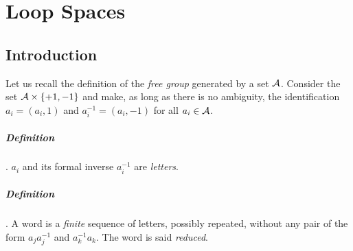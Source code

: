 \chapter{Loop Spaces}

\section{Introduction}

Let us recall the definition of the  {\em free group} generated by a set ${\cal A}$.
Consider the set ${\cal A}\times \lbrace +1, -1 \rbrace$ and
make, as long as there is no ambiguity, the identification $a_i= (a_i,1)$ and $a_i^{-1}= (a_i,-1)$
for all $a_i\in{\cal A}$.

\paragraph{Definition}.  $a_i$ and its formal inverse $a_i^{-1}$ are  {\em letters}.

\paragraph{Definition}. A word is a {\em finite} sequence of letters, possibly repeated,
without any pair of the form $a_ja_j^{-1}$ and $a_k^{-1}a_k$. The word is said {\em reduced}.

